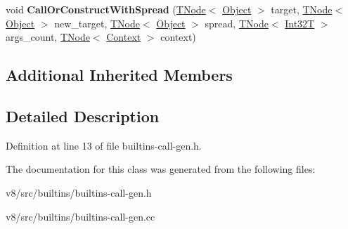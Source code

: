 \begin{DoxyCompactItemize}
\item 
\mbox{\label{classv8_1_1internal_1_1CallOrConstructBuiltinsAssembler_a9709203768b82eb57893e6b2fa3c4be1}} 
void {\bfseries Call\+Or\+Construct\+With\+Spread} (\mbox{\hyperlink{classv8_1_1internal_1_1compiler_1_1TNode}{T\+Node}}$<$ \mbox{\hyperlink{classv8_1_1internal_1_1Object}{Object}} $>$ target, \mbox{\hyperlink{classv8_1_1internal_1_1compiler_1_1TNode}{T\+Node}}$<$ \mbox{\hyperlink{classv8_1_1internal_1_1Object}{Object}} $>$ new\+\_\+target, \mbox{\hyperlink{classv8_1_1internal_1_1compiler_1_1TNode}{T\+Node}}$<$ \mbox{\hyperlink{classv8_1_1internal_1_1Object}{Object}} $>$ spread, \mbox{\hyperlink{classv8_1_1internal_1_1compiler_1_1TNode}{T\+Node}}$<$ \mbox{\hyperlink{structv8_1_1internal_1_1Int32T}{Int32T}} $>$ args\+\_\+count, \mbox{\hyperlink{classv8_1_1internal_1_1compiler_1_1TNode}{T\+Node}}$<$ \mbox{\hyperlink{classv8_1_1internal_1_1Context}{Context}} $>$ context)
\end{DoxyCompactItemize}
\subsection*{Additional Inherited Members}


\subsection{Detailed Description}


Definition at line 13 of file builtins-\/call-\/gen.\+h.



The documentation for this class was generated from the following files\+:\begin{DoxyCompactItemize}
\item 
v8/src/builtins/builtins-\/call-\/gen.\+h\item 
v8/src/builtins/builtins-\/call-\/gen.\+cc\end{DoxyCompactItemize}
